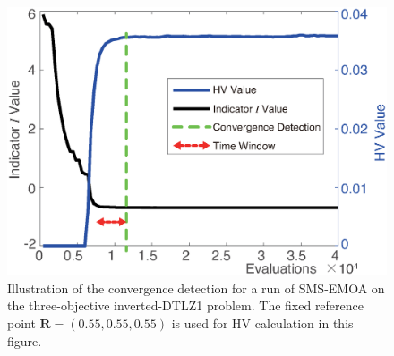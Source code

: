 \documentclass[conference]{IEEEtran}
\begin{document}
\begin{figure}[!t]
  \centering
    \includegraphics[width=\columnwidth]{FVEMOA_IDTLZ1_M3_nadir_1}
  \caption{
  Illustration of the convergence detection for a run of SMS-EMOA on the three-objective inverted-DTLZ1 problem.
  The fixed reference point $\boldsymbol R = (0.55, 0.55, 0.55)$ is used for HV calculation in this figure.
  }
  \label{wcd1}
\end{figure}
\end{document}
